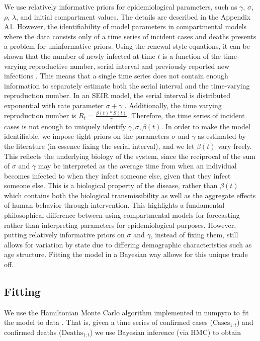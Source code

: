 \documentclass[11pt]{amsart}
\begin{document}
We use relatively informative priors for epidemiological parameters, such as $\gamma$, $\sigma$, $\rho$,  $\lambda$, and initial compartment values. The details are described in the Appendix A1. However, the identifiability of model parameters in compartmental models where the data consists only of a time series of incident cases and deaths presents a problem for uninformative priors. Using the renewal style equations, it can be shown that the number of newly infected at time $t$ is a function of the time-varying reproductive number, serial interval and previously reported new infections \cite{wallinga2007generation}. This means that a single time series does not contain enough information to separately estimate both the serial interval and the time-varying reproduction number. In an SEIR model, the serial interval is distributed exponential with rate parameter $\sigma + \gamma$ \cite{wallinga2007generation}. Additionally, the time varying reproduction number is $R_t = \frac{\beta(t)*S(t)}{\gamma}$. Therefore, the time series of incident cases is not enough to uniquely identify $\gamma,\sigma,\beta(t)$. In order to make the model identifiable, we impose tight priors on the parameters $\sigma$ and $\gamma$ as estimated by the literature (in essence fixing the serial interval), and we let $\beta(t)$ vary freely. This reflects the underlying biology of the system, since the reciprocal of the sum of $\sigma$ and $\gamma$ may be interpreted as the average time from when an individual becomes infected to when they infect someone else, given that they infect someone else. This is a biological property of the disease, rather than $\beta(t)$ which contains both the biological transmissibility as well as the aggregate effects of human behavior through intervention. This highlights a fundamental philosophical difference between using compartmental models for forecasting rather than interpreting parameters for epidemiological purposes. However, putting relatively informative priors on $\sigma$ and $\gamma$, instead of fixing them, still allows for variation by state due to differing demographic characteristics such as age structure. Fitting the model in a Bayesian way allows for this unique trade off.  

  \subsection{Fitting}
We use the Hamiltonian Monte Carlo algorithm implemented in numpyro to fit the model to data \cite{numpyro}. That is, given a time series of confirmed cases ($\text{Cases}_{1:t}$) and confirmed deaths ($\text{Deaths}_{1:t}$) we use Bayesian inference (via HMC) to obtain 
\end{document}

